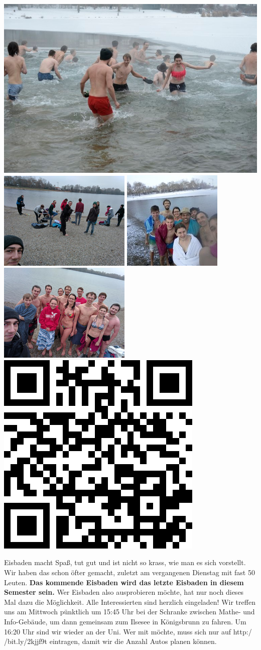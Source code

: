 \documentclass[a4paper,ngerman,landscape]{scrartcl}
\begin{document}
\begin{center}
  \includegraphics[height=0.15\textwidth]{eisbaden-5}
  \includegraphics[height=0.15\textwidth]{eisbaden-3}
  \includegraphics[height=0.15\textwidth]{eisbaden-1}
  \includegraphics[height=0.15\textwidth]{eisbaden-2}
  \includegraphics[height=0.15\textwidth]{eisbaden-qrcode4}

  \Huge

  \large
  \begin{minipage}{0.92\textwidth}
    \renewcommand{\baselinestretch}{1.3}

    \setlength\parskip{\medskipamount}
    \vspace{0.3em}
    Eisbaden macht Spaß, tut gut und ist nicht so krass, wie man es sich vorstellt.
    Wir haben das schon öfter gemacht, zuletzt am vergangenen Dienstag mit fast
    50 Leuten. \textbf{Das kommende Eisbaden wird das letzte Eisbaden in diesem
    Semester sein.} Wer Eisbaden also ausprobieren möchte, hat nur noch dieses
    Mal dazu die Möglichkeit. Alle Interessierten sind herzlich eingeladen!
    Wir treffen uns am Mittwoch pünktlich um 15:45 Uhr bei der
    Schranke zwischen Mathe- und Info-Gebäude, um dann gemeinsam zum Ilsesee in
    Königsbrunn zu fahren. Um 16:20 Uhr sind wir wieder an der Uni.
    Wer mit möchte, muss sich nur auf \textsf{http:/$\!$/bit.ly/2kjjf9t} eintragen, damit
    wir die Anzahl Autos planen können.
    \vspace{0.3em}
  \end{minipage}


\end{center}
\end{document}
